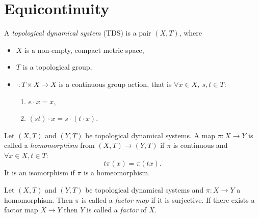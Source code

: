 \section{Equicontinuity}

\begin{definition}
	A \emph{topological dynamical system} (TDS) is a pair $(X, T)$, where
	\begin{itemize}
		\item $X$ is a non-empty, compact metric space,
		\item $T$ is a topological group,
		\item $\cdot : T \times  X \to X$ is a continuous group action, that is $\forall x \in X, \ s,t \in T$: 
		\begin{enumerate}
			\item $ e \cdot x = x$,
			\item $(st)\cdot x = s \cdot (t \cdot x)$.
		\end{enumerate}
	\end{itemize}
\end{definition}

\begin{definition}
	Let $(X, T)$ and $(Y,T)$ be topological dynamical systems. A map $\pi : X \to Y$ is called a \emph{homomorphism} from $(X, T) \to (Y, T)$ if $\pi$ is continuous and $\forall x \in X, t \in T$:
	\begin{equation*}
		t \pi (x) = \pi(tx).
	\end{equation*}
	It is an isomorphism if $\pi$ is a homeomorphism.
\end{definition}

\begin{definition}
	Let $(X, T)$ and $(Y, T)$ be topological dynamical systems and $\pi: X \to Y$ a homomorphism. Then $\pi$ is called a \emph{factor map} if it is surjective.
	If there exists a factor map $X \to Y$ then $Y$ is called a \emph{factor} of $X$.
\end{definition}


